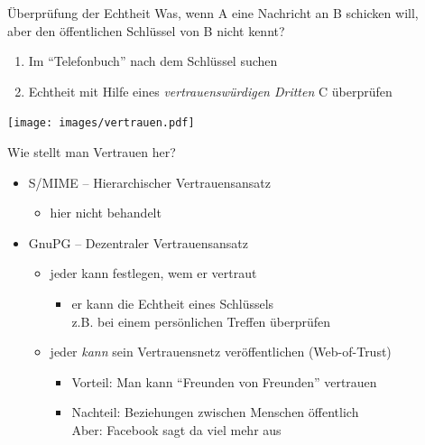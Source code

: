 \begin{frame}{Überprüfung der Echtheit}
Was, wenn A eine Nachricht an B schicken will,\\ aber den öffentlichen Schlüssel von B nicht kennt?\\
\begin{enumerate}
  \item Im ``Telefonbuch'' nach dem Schlüssel suchen
  \item Echtheit mit Hilfe eines \emph{vertrauenswürdigen Dritten} C überprüfen
\end{enumerate}
\begin{center}
  \texttt{[image: images/vertrauen.pdf]}
\end{center}
\end{frame}

\begin{frame}{Wie stellt man Vertrauen her?}
  \begin{itemize}
    \item S/MIME -- Hierarchischer Vertrauensansatz
    \begin{itemize}
      \item hier nicht behandelt
    \end{itemize}
    \item GnuPG -- Dezentraler Vertrauensansatz
    \begin{itemize}
      \item jeder kann festlegen, wem er vertraut
      \begin{itemize}
        \item er kann die Echtheit eines Schlüssels\\ z.B. bei einem persönlichen Treffen überprüfen
      \end{itemize}
      \item jeder \emph{kann} sein Vertrauensnetz veröffentlichen (Web-of-Trust)
      \begin{itemize}
        \item Vorteil: Man kann ``Freunden von Freunden'' vertrauen
        \item Nachteil: Beziehungen zwischen Menschen öffentlich\\ Aber: Facebook sagt da viel mehr aus
      \end{itemize}
    \end{itemize}
  \end{itemize}
\end{frame}

\endinput
